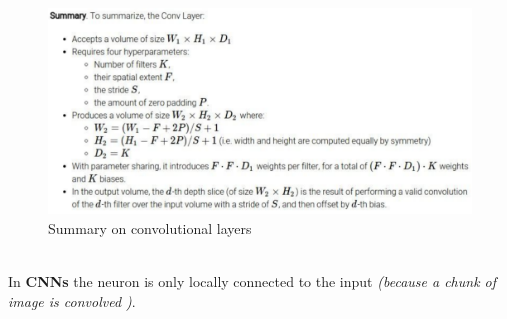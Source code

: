 \documentclass[11pt]{article}
\begin{document}
\begin{figure}[h]
\centering
\captionsetup{justification=centering}
\includegraphics[width=0.9\linewidth]{L417.pdf}
\caption{ Summary on convolutional layers}
\label{fig:L417}
\end{figure}\\
In \textbf{CNNs} the neuron is only locally connected to the input \textit{(because a chunk of image  is convolved )}.
\clearpage
\end{document}
